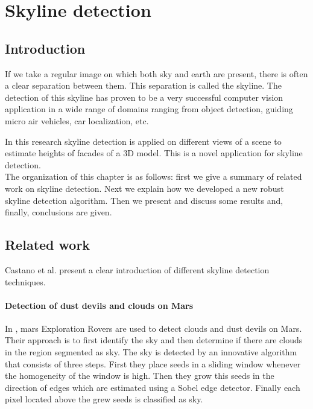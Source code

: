 
\section{Skyline detection}
\label{sec:skylinedetection}
 \subsection{Introduction}
If we take a regular image on which both sky and earth are present, there
is often a clear separation between them. This separation is called the
skyline. %
The detection of this skyline has proven to be a very successful computer vision
application in a wide range of domains ranging from object detection, 
guiding micro air vehicles, car localization, etc. 

In this research skyline detection is applied on different views of a scene to
estimate heights of facades of a 3D model. This is a novel application for
skyline detection.\\

The organization of this chapter is as follows: first we give a summary of
related work on skyline detection. Next we explain how we developed a new
robust skyline detection algorithm. Then we present and discuss some results
and, finally, conclusions are given.

\subsection{Related work}
Castano et al. \cite{Dust} present a clear introduction of different skyline
detection techniques. 

\paragraph{Detection of dust devils and clouds on Mars}
In \cite{Dust}, mars Exploration Rovers are used to detect clouds and dust devils on Mars.
Their approach is to first identify the sky and then determine if there are
clouds in the region segmented as sky. The sky is detected by an innovative
algorithm that consists of three steps. First they place seeds in a sliding
window whenever the homogeneity of the window is high. Then they grow this seeds
in the direction of edges which are estimated using a Sobel edge detector.
Finally each pixel located above the grew seeds is classified as sky.\\

